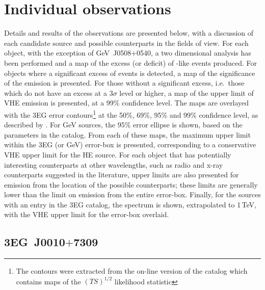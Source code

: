 \section{Individual observations}

Details and results of the observations are presented below, with a
discussion of each candidate source and possible counterparts in the
fields of view. For each object, with the exception of GeV~J0508$+$0540,
a two dimensional analysis has been performed and a map of the excess
(or deficit) of {\Grayc}-like events produced. For objects where a
significant excess of events is detected, a map of the significance of
the emission is presented. For those without a significant excess,
i.e.\ those which do not have an excess at a $3\sigma$ level or
higher, a map of the upper limit of VHE \Gray emission is presented,
at a 99\% confidence level. The maps are overlayed with the 3EG error
contours\footnote{The contours were extracted from the on-line version
of the catalog which contains maps of the $(TS)^{1/2}$ likelihood
statistic} at the 50\%, 69\%, 95\% and 99\% confidence level, as
described by \citet{REF::MATTOX::APJ1996}. For GeV sources, the 95\%
error ellipse is shown, based on the parameters in the catalog.  From
each of these maps, the maximum upper limit within the 3EG (or GeV)
error-box is presented, corresponding to a conservative VHE upper
limit for the HE \Gray source. For each object that has potentially
interesting counterparts at other wavelengths, such as radio and x-ray
counterparts suggested in the literature, upper limits are also
presented for emission from the location of the possible counterparts;
these limits are generally lower than the limit on emission from the
entire error-box. Finally, for the sources with an entry in the 3EG
catalog, the \Gray spectrum is shown, extrapolated to 1\,TeV, with the
VHE upper limit for the error-box overlaid.

\subsection{3EG~J0010$+$7309}

